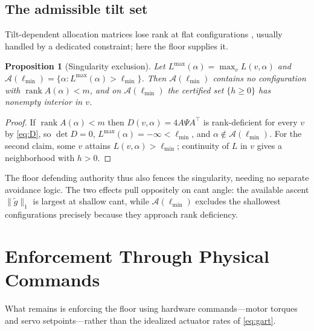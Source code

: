 \documentclass[letter, 10 pt, journal, twoside]{IEEEtran}
\theoremstyle{compact}
\newtheorem{proposition}[theorem]{Proposition}
\begin{document}

\subsection{The admissible tilt set}
 
Tilt-dependent allocation matrices lose rank at flat configurations \cite{Allenspach2020}, usually handled by a dedicated constraint; here the floor supplies it.
 
\begin{proposition}[Singularity exclusion]\label{prop:tiltbox}
Let $L^{\max}(\alpha)=\max_v L(v,\alpha)$ and $\mathcal{A}(\ell_{\min})=\{\alpha : L^{\max}(\alpha)>\ell_{\min}\}$. Then $\mathcal{A}(\ell_{\min})$ contains no configuration with $\operatorname{rank}A(\alpha)<m$, and on $\mathcal{A}(\ell_{\min})$ the certified set $\{h\ge0\}$ has nonempty interior in $v$.
\end{proposition}
 
\begin{proof}
If $\operatorname{rank}A(\alpha)<m$ then $D(v,\alpha)=4A\Psi A^{\!\top}$ is rank-deficient for every $v$ by \eqref{eq:D}, so $\det D=0$, $L^{\max}(\alpha)=-\infty<\ell_{\min}$, and $\alpha\notin\mathcal{A}(\ell_{\min})$. For the second claim, some $v$ attains $L(v,\alpha)>\ell_{\min}$; continuity of $L$ in $v$ gives a neighborhood with $h>0$.
\end{proof}
 
The floor defending authority thus also fences the singularity, needing no separate avoidance logic. The two effects pull oppositely on cant angle: the available ascent $\|\tilde g\|_1$ is largest at shallow cant, while $\mathcal{A}(\ell_{\min})$ excludes the shallowest configurations precisely because they approach rank deficiency. %



\section{Enforcement Through Physical Commands}
\label{sec:upcqp}

What remains is enforcing the floor using hardware commands---motor torques and servo setpoints---rather than the idealized actuator rates of \eqref{eq:gart}. %
\end{document}
